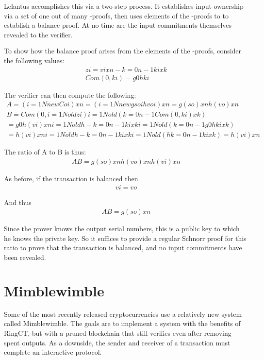 \documentclass{article}
\begin{document}
Lelantus accomplishes this via a two step process.  It establishes input ownership via a set of one out of many -proofs, then uses elements of the -proofs to to establish a balance proof.  At no time are the input commitments themselves revealed to the verifier.

To show how the balance proof arises from the elements of the -proofs, consider the following values:
\begin{align}
  zi=vixn-k=0n-1kixk\\
  Com(0,ki)=g0hki
\end{align}

The verifier can then compute the following:
\begin{align}
  A=(i=1NnewCoi)xn=(i=1Nnewgsoihvoi)xn=g( so) xnh( vo) xn\\
  B=Com(0,i=1Noldzi) i=1Nold(k=0n-1Com(0,ki)xk)\\
  =g0h( vi) xn i=1Noldh-k=0n-1kixki=1Nold(k=0n-1g0hkixk)\\
  =h( vi) xn i=1Noldh-k=0n-1kixki=1Nold(hk=0n-1kixk)=h( vi) xn
\end{align}

The ratio of A to B is thus:
\begin{align}
  AB=g( so) xnh( vo) xnh( vi) xn
\end{align}
  
As before, if the transaction is balanced then 
\begin{align}
  vi= vo
\end{align}

And thus
\begin{align}
  AB=g( so) xn
\end{align}

Since the prover knows the output serial numbers, this is a public key to which he knows the private key.  So it suffices to provide a regular Schnorr proof for this ratio to prove that the transaction is balanced, and no input commitments have been revealed.



\section{Mimblewimble}

Some of the most recently released cryptocurrencies use a relatively new system called Mimblewimble.  The goals are to implement a system with the benefits of RingCT, but with a pruned blockchain that still verifies even after removing spent outputs.  As a downside, the sender and receiver of a transaction must complete an interactive protocol.
\end{document}
